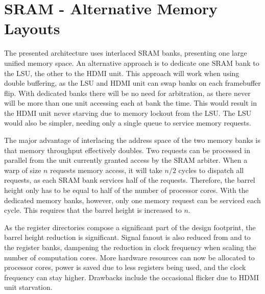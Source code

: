 \section{SRAM - Alternative Memory Layouts}

The presented architecture uses interlaced SRAM banks, presenting one large unified memory space.
An alternative approach is to dedicate one SRAM bank to the LSU, the other to the HDMI unit.
This approach will work when using double buffering, as the LSU and HDMI unit can swap banks on each framebuffer flip.
With dedicated banks there will be no need for arbitration, as there never will be more than one unit accessing each at bank the time.
This would result in the HDMI unit never starving due to memory lockout from the LSU.
The LSU would also be simpler, needing only a single queue to service memory requests.

The major advantage of interlacing the address space of the two memory banks is that memory throughput effectively doubles.
Two requests can be processed in parallel from the unit currently granted access by the SRAM arbiter.
When a warp of size $n$ requests memory access, it will take $n/2$ cycles to dispatch all requests, as each SRAM bank services half of the requests.
Therefore, the barrel height only has to be equal to half of the number of processor cores.
With the dedicated memory banks, however, only one memory request can be serviced each cycle.
This requires that the barrel height is increased to $n$.

As the register directories compose a significant part of the design footprint, the barrel height reduction is significant.
Signal fanout is also reduced from and to the register banks, dampening the reduction in clock frequency when scaling the number of computation cores.
More hardware resources can now be allocated to processor cores, power is saved due to less registers being used, and the clock frequency can stay higher.
Drawbacks include the occasional flicker due to HDMI unit starvation.
